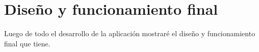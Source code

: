 \section{Diseño y funcionamiento final}
Luego de todo el desarrollo de la aplicación mostraré el diseño y funcionamiento final que tiene.